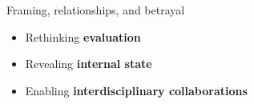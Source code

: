 \documentclass[compress]{beamer}
\begin{document}
\begin{frame}[plain]

\end{frame}


%

        \begin{frame}{Framing, relationships, and betrayal}

           \begin{itemize}
              \item Rethinking {\bf evaluation}
                \item Revealing {\bf internal state}
                    \item Enabling {\bf interdisciplinary collaborations}
            \end{itemize}

\end{frame}
\end{document}
